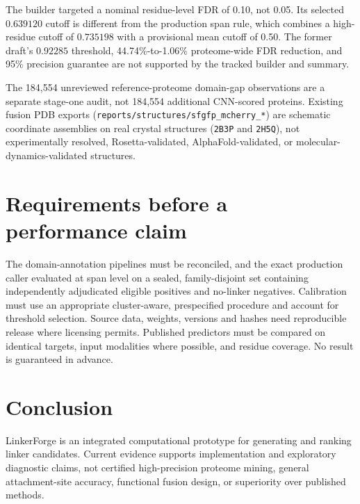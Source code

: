 \documentclass{article}
\begin{document}
The builder targeted a nominal residue-level FDR of 0.10, not 0.05. Its selected $0.639120$ cutoff is different from the production span rule, which combines a high-residue cutoff of $0.735198$ with a provisional mean cutoff of 0.50. The former draft's $0.92285$ threshold, 44.74\%-to-1.06\% proteome-wide FDR reduction, and 95\% precision guarantee are not supported by the tracked builder and summary.

The 184,554 unreviewed reference-proteome domain-gap observations are a separate stage-one audit, not 184,554 additional CNN-scored proteins. Existing fusion PDB exports (\texttt{reports/structures/sfgfp\_mcherry\_*}) are schematic coordinate assemblies on real crystal structures (\texttt{2B3P} and \texttt{2H5Q}), not experimentally resolved, Rosetta-validated, AlphaFold-validated, or molecular-dynamics-validated structures.

\section{Requirements before a performance claim}
The domain-annotation pipelines must be reconciled, and the exact production caller evaluated at span level on a sealed, family-disjoint set containing independently adjudicated eligible positives and no-linker negatives. Calibration must use an appropriate cluster-aware, prespecified procedure and account for threshold selection. Source data, weights, versions and hashes need reproducible release where licensing permits. Published predictors must be compared on identical targets, input modalities where possible, and residue coverage. No result is guaranteed in advance.

\section{Conclusion}
LinkerForge is an integrated computational prototype for generating and ranking linker candidates. Current evidence supports implementation and exploratory diagnostic claims, not certified high-precision proteome mining, general attachment-site accuracy, functional fusion design, or superiority over published methods.
\end{document}
